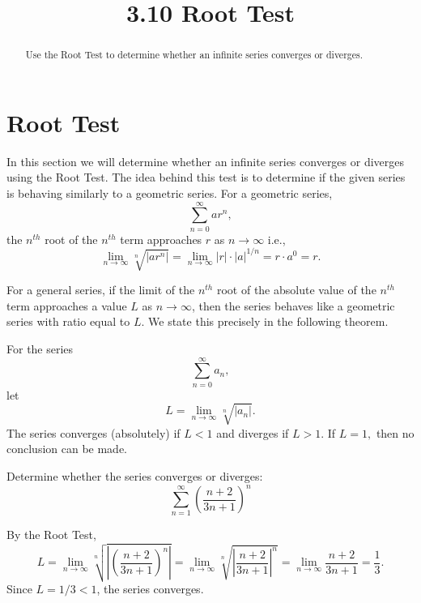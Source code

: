 \documentclass[handout]{ximera}
\title{3.10 Root Test}
\begin{document}
\begin{abstract}
Use the Root Test to determine whether an infinite series converges or diverges.
\end{abstract}

\maketitle

\section{Root Test}

In this section we will determine whether an infinite series converges or diverges using the Root Test. 
The idea behind this test is to determine if the given series is behaving similarly to a geometric series.
For a geometric series, 
\[
\sum_{n=0}^\infty ar^n,
\]
the $n^{th}$ root of the $n^{th}$ term approaches $r$ as $n \to \infty$ i.e., 
\[
\lim_{n \to \infty} \sqrt[n]{\left|ar^n\right|} = \lim_{n \to \infty} \left|r\right| \cdot \left|a\right|^{1/n} = r\cdot a^0 = r.
\]



For a general series, if the limit of the $n^{th}$ root of the absolute value of the $n^{th}$ term
approaches a value $L$ as $n \to \infty$, then the series behaves like a geometric series with ratio equal to $L$.
We state this precisely in the following theorem.

\begin{theorem}
For the series
\[
\sum_{n=0}^\infty a_n,
\]
let
\[
L = \lim_{n \to \infty} \sqrt[n]{\left|{a_n}\right|}.
\]
The series converges (absolutely) if $L < 1$ and diverges if $L>1$. 
If $L = 1,$ then no conclusion can be made.

\end{theorem}






\begin{example}[example 1]
Determine whether the series converges or diverges:
\[
\sum_{n=1}^\infty \left(\frac{n+ 2}{3n+1}\right)^n
\]


By the Root Test,
\[
L =  \lim_{n \to \infty} \sqrt[n]{\left|\left(\frac{n+ 2}{3n+1}\right)^n\right|}=  \lim_{n \to \infty} \sqrt[n]{\left|\frac{n+ 2}{3n+1}\right|^n} = \lim_{n \to \infty} \frac{n+ 2}{3n+1} = \frac13.
\]
Since $L = 1/3 < 1$, the series converges.

\end{example}
\end{document}
